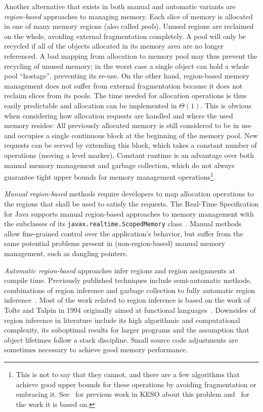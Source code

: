		Another alternative that exists in both manual and automatic variants are \emph{region-based} approaches to managing
		memory. Each slice of memory is allocated in one of many memory regions (also called \emph{pools}). Unused regions
		are reclaimed on the whole, avoiding external fragmentation completely. A pool will only be recycled if all of the
		objects allocated in its memory area are no longer referenced. A bad mapping from allocation to memory pool may thus
		prevent the recycling of unused memory; in the worst case a single object can hold a whole pool \enquote{hostage},
		preventing its re-use. On the other hand, region-based memory management does not suffer from external fragmentation
		because it does not reclaim slices from its pools. The time needed for allocation operations is thus easily
		predictable and allocation can be implemented in $\Theta(1)$. This is obvious when considering how allocation
		requests are handled and where the used memory resides: All previously allocated memory is still considered to be in
		use and occupies a single continuous block at the beginning of the memory pool. New requests can be served by
		extending this block, which takes a constant number of operations (moving a level marker). Constant runtime is an
		advantage over both manual memory management and garbage collection, which do not always guarantee tight upper
		bounds for memory management operations\footnote{This is not to say that they cannot, and there are a few algorithms
		that achieve good upper bounds for these operations by avoiding fragmentation or embracing it. See~\cite{strotz:14}
		for previous work in KESO about this problem and~\cite{pizlo:10:pldi} for the work it is based on.}.

		\emph{Manual region-based} methods require developers to map allocation operations to the regions that shall be used
		to satisfy the requests. The Real-Time Specification for Java supports manual region-based approaches to memory
		management with the subclasses of its \texttt{javax.realtime.ScopedMemory} class~\cite{rtsj:06:scoped}. Manual
		methods allow fine-grained control over the application's behavior, but suffer from the same potential problems
		present in (non-region-based) manual memory management, such as dangling pointers.

		\emph{Automatic region-based} approaches infer regions and region assignments at compile time. Previously published
		techniques include semi-automatic methods, combinations of region inference and garbage collection to fully
		automatic region inference~\cite{grossman:02:pldi, hallenberg:02:sigplan, chin:04:pldi}. Most of the work related to
		region inference is based on the work of Tofte and Talpin in 1994 originally aimed at functional
		languages~\cite{tofte:94:popl}. Downsides of region inference in literature include its high algorithmic and
		computational complexity, its suboptimal results for larger programs and the assumption that object lifetimes follow
		a stack discipline. Small source code adjustments are sometimes necessary to achieve good memory
		performance.~\cite{henglein:01:ppdp}

